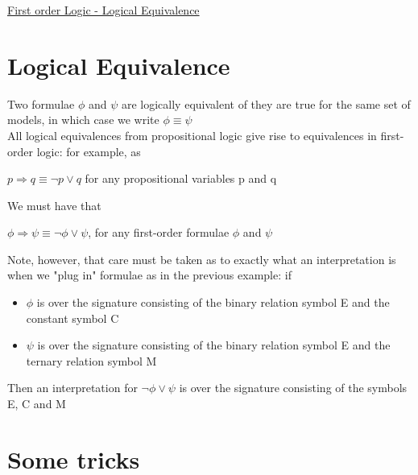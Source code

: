 \documentclass{article}[18pt]
\begin{document}
\begin{center}
\underline{\huge First order Logic - Logical Equivalence}
\end{center}
\section{Logical Equivalence}
Two formulae $\phi$ and $\psi$ are logically equivalent of they are true for the same set of models, in which case we write $\phi\equiv\psi$\\
All logical equivalences from propositional logic give rise to equivalences in first-order logic: for example, as
\begin{center}
	$p\Rightarrow q \equiv \lnot p \lor q$ for any propositional variables p and q
\end{center}
We must have that
\begin{center}
	$\phi\Rightarrow\psi \equiv \lnot \phi \lor \psi$, for any first-order formulae $\phi$ and $\psi$
\end{center}
Note, however, that care must be taken as to exactly what an interpretation is when we "plug in" formulae as in the previous example: if
\begin{itemize}
	\item $\phi$ is over the signature consisting of the binary relation symbol E and the constant symbol C
	\item $\psi$ is over the signature consisting of the binary relation symbol E and the ternary relation symbol M
\end{itemize}
Then an interpretation for $\lnot \phi \lor \psi$ is over the signature consisting of the symbols E, C and M
\section{Some tricks}
\end{document}
